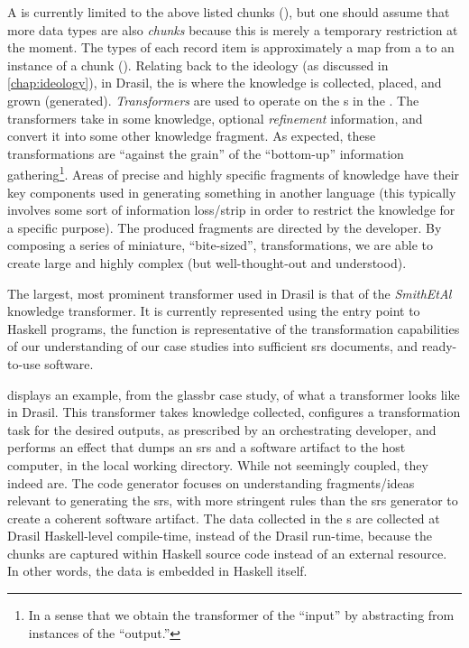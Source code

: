 A \ChunkDB{} is currently limited to the above listed chunks
(), but one should assume that more data types are
also \textit{chunks} because this is merely a temporary restriction at the
moment. The types of each record item is approximately a map from a \UID{} to an
instance of a chunk (). Relating back to the
ideology (as discussed in \autoref{chap:ideology}), in Drasil, the \ChunkDB{} is
where the knowledge is collected, placed, and grown (generated).
\textit{Transformers} are used to operate on the \Chunk{}s in the \ChunkDB{}.
The transformers take in some knowledge, optional \textit{refinement}
information, and convert it into some other knowledge fragment. As expected,
these transformations are ``against the grain'' of the ``bottom-up'' information
gathering\footnote{In a sense that we obtain the transformer of the ``input'' by
abstracting from instances of the ``output.''}. Areas of precise and highly
specific fragments of knowledge have their key components used in generating
something in another language (this typically involves some sort of information
loss/strip in order to restrict the knowledge for a specific purpose). The
produced fragments are directed by the developer. By composing a series of
miniature, ``bite-sized'', transformations, we are able to create large and
highly complex (but well-thought-out and understood).

The largest, most prominent transformer used in Drasil is that of the
\textit{SmithEtAl} knowledge transformer. It
is currently represented using the entry point to Haskell programs, the
 function is representative of the transformation
capabilities of our understanding of our case studies into sufficient \acs{srs}
documents, and ready-to-use software.

\currentGlassBRMainFHaskell{}

 displays an example, from the \acs{glassbr} case
study, of what a transformer looks like in Drasil. This transformer takes
knowledge collected, configures a transformation task for the desired outputs,
as prescribed by an orchestrating developer, and performs an 
effect that dumps an \acs{srs} and a software artifact to the host computer, in
the local working directory. While not seemingly coupled, they indeed are. The
code generator focuses on understanding fragments/ideas relevant to generating
the \acs{srs}, with more stringent rules than the \acs{srs} generator to create
a coherent software artifact. The data collected in the \ChunkDB{}s are
collected at Drasil Haskell-level compile-time, instead of the Drasil run-time,
because the chunks are captured within Haskell source code instead of an
external resource. In other words, the data is embedded in Haskell itself.

